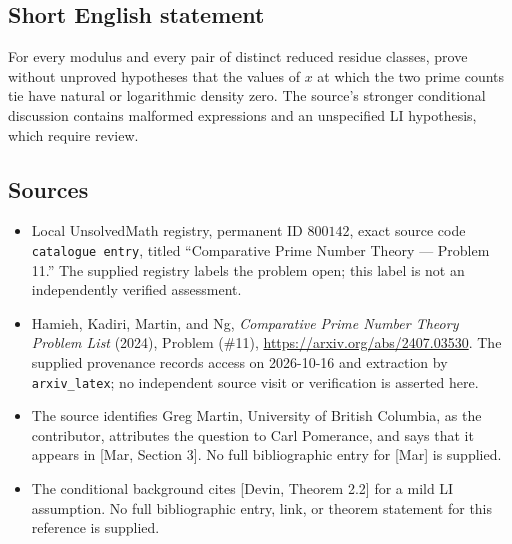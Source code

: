 \documentclass[11pt]{article}
\begin{document}
\subsection{Short English statement}
For every modulus and every pair of distinct reduced residue classes, prove without unproved hypotheses that the values of \(x\) at which the two prime counts tie have natural or logarithmic density zero. The source's stronger conditional discussion contains malformed expressions and an unspecified LI hypothesis, which require review.
\subsection{Sources}
\begin{itemize}
\item Local UnsolvedMath registry, permanent ID \(800142\), exact source code \texttt{catalogue entry}, titled ``Comparative Prime Number Theory --- Problem 11.'' The supplied registry labels the problem open; this label is not an independently verified assessment.
\item Hamieh, Kadiri, Martin, and Ng, \emph{Comparative Prime Number Theory Problem List} (2024), Problem (\#11), \url{https://arxiv.org/abs/2407.03530}. The supplied provenance records access on 2026-10-16 and extraction by \texttt{arxiv\_latex}; no independent source visit or verification is asserted here.
\item The source identifies Greg Martin, University of British Columbia, as the contributor, attributes the question to Carl Pomerance, and says that it appears in [Mar, Section 3]. No full bibliographic entry for [Mar] is supplied.
\item The conditional background cites [Devin, Theorem 2.2] for a mild LI assumption. No full bibliographic entry, link, or theorem statement for this reference is supplied.
\end{itemize}
\end{document}
